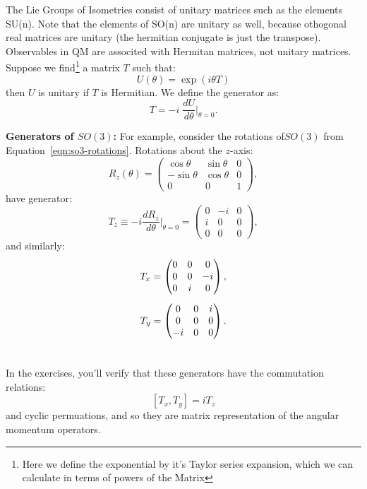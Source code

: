\documentclass[12pt]{article}
\begin{document}
The Lie Groups of Isometries consist of unitary matrices such as the
elements SU(n).  Note that the elements of SO(n) are unitary as well,
because othogonal real matrices are unitary (the hermitian conjugate
is just the transpose). Observables in QM are associted with Hermitan
matrices, not unitary matrices.  Suppose we find\footnote{Here we
define the exponential by it's Taylor series expansion, which we can
calculate in terms of powers of the Matrix} a matrix $T$ such that:
$$U(\theta) = \exp(i \theta T)$$
then $U$ is unitary if $T$ is Hermitian.  We define the generator as:
\begin{equation}
  T = -i\;\frac{dU}{d\theta}\bigg|_{\theta=0}.
\end{equation}

\noindent\textbf{Generators of $SO(3)$:} For example, consider the
rotations of$SO(3)$ from Equation~\ref{eqn:so3-rotations}.  Rotations
about the $z$-axis:
\begin{equation*}
  R_z(\theta) = \begin{pmatrix}\cos\theta& \sin\theta&0\\ -\sin\theta&\cos\theta&0\\0&0&1\end{pmatrix},
\end{equation*}
have generator:
\begin{equation}
  \label{eqn:tz}
  T_z \equiv -i \frac{dR_z}{d\theta}\bigg|_{\theta=0} = \begin{pmatrix}0&-i&0\\i&0&0\\0&0&0\end{pmatrix},
\end{equation}
and similarly:
\begin{align}
\notag
T_x &= \begin{pmatrix}0&0 &0\\0&0&-i\\0&i&0\end{pmatrix}, \\[5pt]
\label{eqn:txy}
T_y &= \begin{pmatrix}0&0&i\\0&0&0\\-i&0&0\end{pmatrix}. \\[5pt]
\notag
\end{align}
In the exercises, you'll verify that these generators have the commutation relations:
\begin{equation}
 \label{eqn:momentum-commutators}      
 [T_x, T_y] = i T_z
\end{equation}
and cyclic permuations, and so they are matrix representation of the angular momentum operators.\\[5pt]
\end{document}
